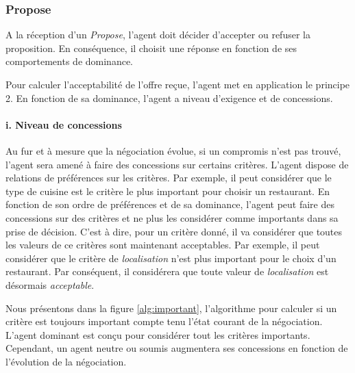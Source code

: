 	
%	
	
	
	
	 
	\subsubsection{Propose}
	A la réception d'un \emph{Propose}, l'agent doit décider d'accepter ou refuser la proposition. En conséquence, il choisit une réponse en fonction de ses comportements de dominance.
	
	Pour calculer l'acceptabilité de l'offre reçue, l'agent met en application le principe 2. En fonction de sa dominance, l'agent a niveau d'exigence et de concessions. 
	\paragraph{i. Niveau de concessions}
	
	Au fur et à mesure que la négociation évolue, si un compromis n'est pas trouvé, l'agent sera amené à faire des concessions sur certains critères. L'agent dispose de relations de préférences sur les critères. Par exemple, il peut considérer que le type de cuisine est le critère le plus important pour choisir un restaurant. En fonction de son ordre de préférences et de sa dominance, l'agent peut faire des concessions sur des critères et ne plus les considérer comme importants dans sa prise de décision. C'est à dire, pour un critère donné, il va considérer que toutes les valeurs de ce critères sont maintenant acceptables. 
	Par exemple, il peut considérer que le critère de \emph{localisation} n'est plus important pour le choix d'un restaurant. Par conséquent, il considérera que toute valeur de \emph{localisation} est désormais \emph{acceptable}.
	
	Nous présentons dans la figure \ref{alg:important}, l'algorithme pour calculer si un critère est toujours important compte tenu l'état courant de la négociation. L'agent dominant est conçu pour considérer tout les critères importants. Cependant, un agent neutre ou soumis augmentera ses concessions en fonction de l'évolution de la négociation. 
	
